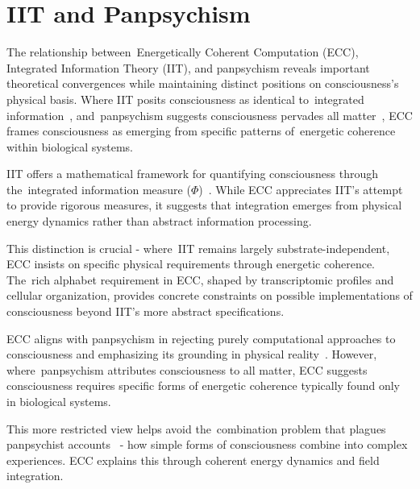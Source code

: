 \section{IIT and Panpsychism}

The relationship between~Energetically Coherent Computation (ECC), Integrated Information Theory (IIT), and panpsychism reveals important theoretical convergences while maintaining distinct positions on consciousness's physical basis. Where IIT posits consciousness as identical to~integrated information~\cite{Tononi2008, Tononi2016}, and~panpsychism suggests consciousness pervades all matter~\cite{Strawson2006, Goff2019}, ECC frames consciousness as emerging from specific patterns of~energetic coherence within biological systems.

IIT offers a mathematical framework for quantifying consciousness through the~integrated information measure ($\Phi$)~\cite{Tononi2016, Oizumi2014}. While ECC appreciates IIT's attempt to provide rigorous measures, it suggests that integration emerges from physical energy dynamics rather than abstract information processing. 

This distinction is crucial - where~IIT remains largely substrate-independent, ECC insists on specific physical requirements through energetic coherence. The~rich alphabet requirement in ECC, shaped by transcriptomic profiles and cellular organization, provides concrete constraints on possible implementations of consciousness beyond IIT's more abstract specifications.

ECC aligns with panpsychism in rejecting purely computational approaches to consciousness and emphasizing its grounding in physical reality~\cite{Nagel1979, Chalmers2015}. However, where~panpsychism attributes consciousness to all matter, ECC suggests consciousness requires specific forms of energetic coherence typically found only in biological systems. 

This more restricted view helps avoid the~combination problem that plagues panpsychist accounts~\cite{Chalmers2015, Skrbina2017} - how simple forms of consciousness combine into complex experiences. ECC explains this through coherent energy dynamics and field integration.

